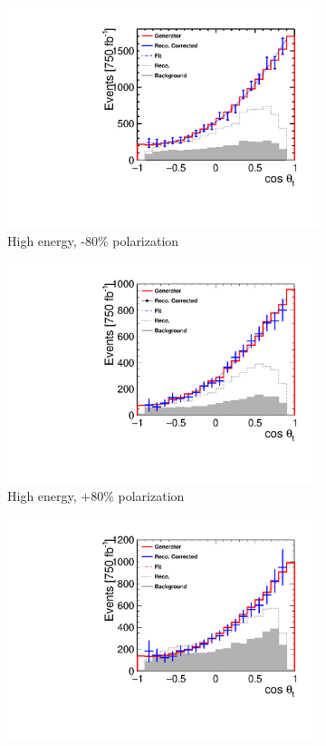 \begin{figure}[] 
  \begin{subfigure}[]{0.5\linewidth}
    \centering
    \includegraphics[width=0.75\linewidth]{TopAnalysis/figures/ThetaPlots_1200GeVNeg.pdf} 
    \caption{High energy, -80\% polarization} 
    \vspace{4ex}
  \end{subfigure}%
  \begin{subfigure}[]{0.5\linewidth}
    \centering
    \includegraphics[width=0.75\linewidth]{TopAnalysis/figures/ThetaPlots_1200GeVPos.pdf} 
    \caption{High energy, +80\% polarization} 
    \vspace{4ex}
  \end{subfigure} 
  \begin{subfigure}[]{0.5\linewidth}
    \centering
    \includegraphics[width=0.75\linewidth]{TopAnalysis/figures/ThetaPlots_900GeVNeg.pdf} 

\end{subfigure}
\end{figure}
